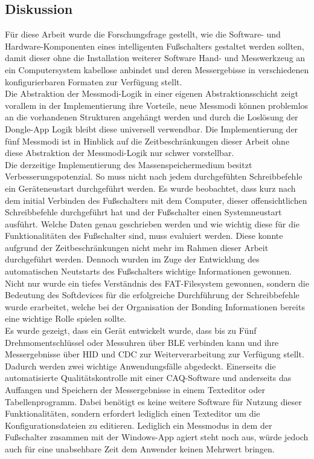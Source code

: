 \subsection{Diskussion}
Für diese Arbeit wurde die Forschungsfrage gestellt, wie die Software- und Hardware-Komponenten eines intelligenten Fußschalters gestaltet werden sollten, damit dieser ohne die Installation weiterer Software Hand- und Messwerkzeug an ein Computersystem kabellose anbindet und deren Messergebisse in verschiedenen konfigurierbaren Formaten zur Verfügung stellt.\\
Die Abstraktion der Messmodi-Logik in einer eigenen Abstraktionsschicht zeigt vorallem in der Implementierung ihre Vorteile, neue Messmodi können problemlos an die vorhandenen Strukturen angehängt werden und durch die Loslösung der Dongle-App Logik bleibt diese universell verwendbar. Die Implementierung der fünf Messmodi ist in Hinblick auf die Zeitbeschränkungen dieser Arbeit ohne diese Abstraktion der Messmodi-Logik nur schwer vorstellbar.\\
Die derzeitige Implementierung des Massenspeichermedium besitzt Verbesserungspotenzial. So muss nicht nach jedem durchgefühten Schreibbefehle ein Geräteneustart durchgeführt werden. Es wurde beobachtet, dass kurz nach dem initial Verbinden des Fußschalters mit dem Computer, dieser offensichtlichen Schreibbefehle durchgeführt hat und der Fußschalter einen Systemneustart ausführt. Welche Daten genau geschrieben werden und wie wichtig diese für die Funktionalitäten des Fußschalter sind, muss evaluiert werden. Diese konnte aufgrund der Zeitbeschränkungen nicht mehr im Rahmen dieser Arbeit durchgeführt werden. Dennoch wurden im Zuge der Entwicklung des automatischen Neutstarts des Fußschalters wichtige Informationen gewonnen. Nicht nur wurde ein tiefes Verständnis des \ac{FAT}-Filesystem gewonnen, sondern die Bedeutung des Softdevices für die erfolgreiche Durchführung der Schreibbefehle wurde erarbeitet, welche bei der Organisation der Bonding Informationen bereits eine wichtige Rolle spielen sollte.\\
Es wurde gezeigt, dass ein Gerät entwickelt wurde, dass bis zu Fünf Drehmomentschlüssel oder Messuhren über \ac{BLE} verbinden kann und ihre Messergebnisse über \ac{HID} und \ac{CDC} zur Weiterverarbeitung zur Verfügung stellt. Dadurch werden zwei wichtige Anwendungsfälle abgedeckt. Einerseits die automatisierte Qualitätskontrolle mit einer \ac{CAQ}-Software und anderseits das Auffangen und Speichern der Messergebnisse in einem Texteditor oder Tabellenprogramm. Dabei benötigt es keine weitere Software für Nutzung dieser Funktionalitäten, sondern erfordert lediglich einen Texteditor um die Konfigurationsdateien zu editieren. Lediglich ein Messmodus in dem der Fußschalter zusammen mit der Windows-App agiert steht noch aus, würde jedoch auch für eine unabsehbare Zeit dem Anwender keinen Mehrwert bringen.\\

